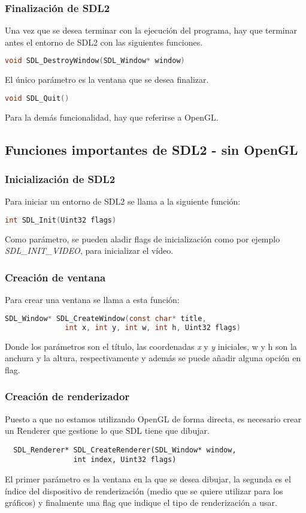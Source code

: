 \subsubsection{Finalización de SDL2}
Una vez que se desea terminar con la ejecución del programa, hay que terminar antes el entorno de SDL2 con las siguientes funciones.
\begin{lstlisting}[language=C]
  void SDL_DestroyWindow(SDL_Window* window)
\end{lstlisting}
El único parámetro es la ventana que se desea finalizar.
\begin{lstlisting}[language=C]
  void SDL_Quit()
\end{lstlisting}

Para la demás funcionalidad, hay que referirse a OpenGL.

\subsection{Funciones importantes de SDL2 - sin OpenGL}
\subsubsection{Inicialización de SDL2}
Para iniciar un entorno de SDL2 se llama a la siguiente función:
\begin{lstlisting}[language=C]
  int SDL_Init(Uint32 flags)
\end{lstlisting}
Como parámetro, se pueden aladir flags de inicialización como por ejemplo \textit{SDL\_INIT\_VIDEO}, para inicializar el vídeo.

\subsubsection{Creación de ventana}
Para crear una ventana se llama a esta función:
\begin{lstlisting}[language=C]
  SDL_Window* SDL_CreateWindow(const char* title,
              int x, int y, int w, int h, Uint32 flags)
\end{lstlisting}
Donde los parámetros son el título, las coordenadas \textit{x} y \textit{y} iniciales, w y h son la anchura y la altura, respectivamente y además se puede añadir alguna opción en flag.

\subsubsection{Creación de renderizador}
Puesto a que no estamos utilizando OpenGL de forma directa, es necesario crear un Renderer que gestione lo que SDL tiene que dibujar.
\begin{lstlisting}
  SDL_Renderer* SDL_CreateRenderer(SDL_Window* window,
                int index, Uint32 flags)
\end{lstlisting}
El primer parámetro es la ventana en la que se desea dibujar, la segunda es el índice del dispositivo de renderización (medio que se quiere utilizar para los gráficos) y finalmente una flag que indique el tipo de renderización a usar.


